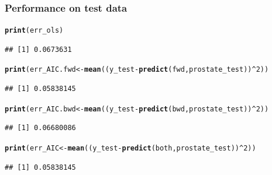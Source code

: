 \documentclass[10pt, c, xcolor=x11names]{beamer}\usepackage[]{graphicx}\usepackage[]{color}
\makeatletter
\newcommand{\hlnum}[1]{\textcolor[rgb]{0.686,0.059,0.569}{#1}}%
\newcommand{\hlopt}[1]{\textcolor[rgb]{0,0,0}{#1}}%
\newcommand{\hlstd}[1]{\textcolor[rgb]{0.345,0.345,0.345}{#1}}%
\newcommand{\hlkwb}[1]{\textcolor[rgb]{0.69,0.353,0.396}{#1}}%
\newcommand{\hlkwd}[1]{\textcolor[rgb]{0.737,0.353,0.396}{\textbf{#1}}}%
\newenvironment{kframe}{%
 \def\at@end@of@kframe{}%
 \ifinner\ifhmode%
  \def\at@end@of@kframe{\end{minipage}}%
  \begin{minipage}{\columnwidth}%
 \fi\fi%
 \def\FrameCommand##1{\hskip\@totalleftmargin \hskip-\fboxsep
 \colorbox{shadecolor}{##1}\hskip-\fboxsep
     \hskip-\linewidth \hskip-\@totalleftmargin \hskip\columnwidth}%
 \MakeFramed {\advance\hsize-\width
   \@totalleftmargin\z@ \linewidth\hsize
   \@setminipage}}%
 {\par\unskip\endMakeFramed%
 \at@end@of@kframe}
\newenvironment{knitrout}{}{} %
\makeatother
\begin{document}
\begin{frame}[fragile]
  \frametitle{Performance on test data}

\begin{knitrout}\scriptsize
{}\color{fgcolor}\begin{kframe}
\begin{alltt}
\hlkwd{print}\hlstd{(err_ols)}
\end{alltt}
\begin{verbatim}
## [1] 0.0673631
\end{verbatim}
\begin{alltt}
\hlkwd{print}\hlstd{(err_AIC.fwd}  \hlkwb{<-} \hlkwd{mean}\hlstd{((y_test} \hlopt{-} \hlkwd{predict}\hlstd{(fwd , prostate_test))}\hlopt{^}\hlnum{2}\hlstd{))}
\end{alltt}
\begin{verbatim}
## [1] 0.05838145
\end{verbatim}
\begin{alltt}
\hlkwd{print}\hlstd{(err_AIC.bwd}  \hlkwb{<-} \hlkwd{mean}\hlstd{((y_test} \hlopt{-} \hlkwd{predict}\hlstd{(bwd , prostate_test))}\hlopt{^}\hlnum{2}\hlstd{))}
\end{alltt}
\begin{verbatim}
## [1] 0.06680086
\end{verbatim}
\begin{alltt}
\hlkwd{print}\hlstd{(err_AIC} \hlkwb{<-} \hlkwd{mean}\hlstd{((y_test} \hlopt{-} \hlkwd{predict}\hlstd{(both, prostate_test))}\hlopt{^}\hlnum{2}\hlstd{))}
\end{alltt}
\begin{verbatim}
## [1] 0.05838145
\end{verbatim}
\end{kframe}
\end{knitrout}

\end{frame}
\end{document}
